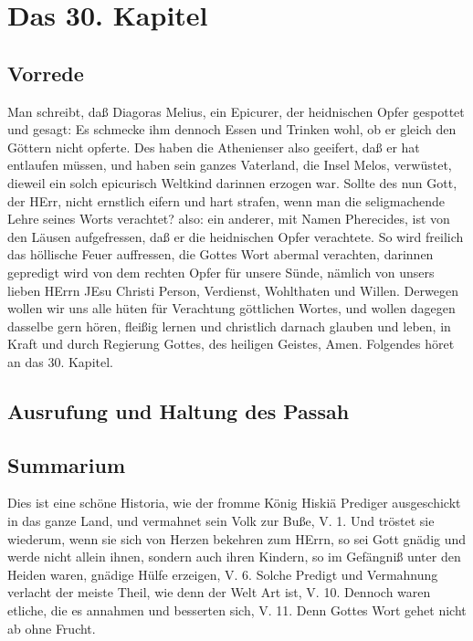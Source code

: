 \chapter{Das 30. Kapitel}

\section{Vorrede}

Man schreibt, daß Diagoras Melius, ein Epicurer, der heidnischen Opfer gespottet und gesagt: Es schmecke ihm dennoch Essen und Trinken wohl, ob er gleich den Göttern nicht opferte. Des haben die Athenienser also geeifert, daß er hat entlaufen müssen, und haben sein ganzes Vaterland, die Insel Melos, verwüstet, dieweil ein solch epicurisch Weltkind darinnen erzogen war. Sollte des nun Gott, der HErr, nicht ernstlich eifern und hart strafen, wenn man die seligmachende Lehre seines Worts verachtet? also: ein anderer, mit Namen Pherecides, ist von den Läusen aufgefressen, daß er die heidnischen Opfer verachtete. So wird freilich das höllische Feuer auffressen, die Gottes Wort abermal verachten, darinnen gepredigt wird von dem rechten Opfer für unsere Sünde, nämlich von unsers lieben HErrn JEsu Christi Person, Verdienst, Wohlthaten und Willen. Derwegen wollen wir uns alle hüten für Verachtung göttlichen Wortes, und wollen dagegen dasselbe gern hören, fleißig lernen und christlich darnach glauben und leben, in Kraft und durch Regierung Gottes, des heiligen Geistes, Amen. Folgendes höret an das 30. Kapitel.

\section[Ausrufung und Haltung des Passah]{Ausrufung und Haltung des Passah}

\section{Summarium}

Dies ist eine schöne Historia, wie der fromme König Hiskiä Prediger ausgeschickt in das ganze Land, und vermahnet sein Volk zur Buße, V. 1. Und tröstet sie wiederum, wenn sie sich von Herzen bekehren zum HErrn, so sei Gott gnädig und werde nicht allein ihnen, sondern auch ihren Kindern, so im Gefängniß unter den Heiden waren, gnädige Hülfe erzeigen, V. 6. Solche Predigt und Vermahnung verlacht der meiste Theil, wie denn der Welt Art ist, V. 10. Dennoch waren etliche, die es annahmen und besserten sich, V. 11. Denn Gottes Wort gehet nicht ab ohne Frucht.

